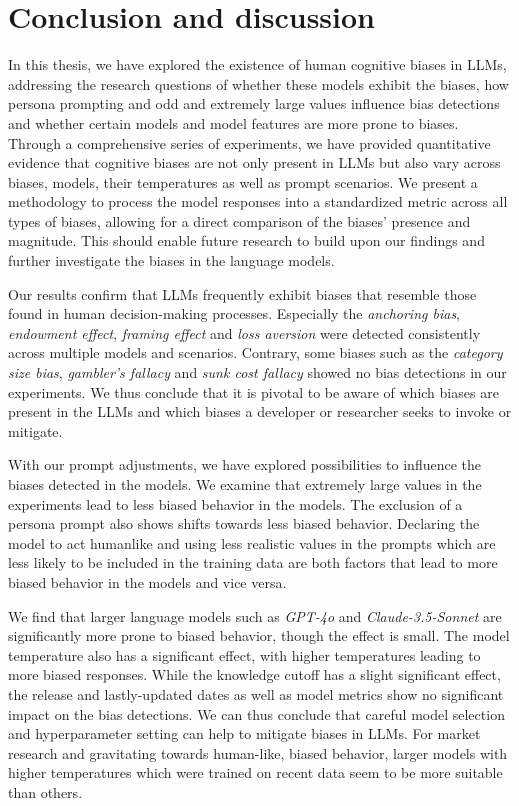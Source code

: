 \section{Conclusion and discussion}
\label{chapter:discussionoutlook}

\par In this thesis, we have explored the existence of human cognitive biases in LLMs, addressing the research questions of whether these models exhibit the biases, how persona prompting and odd and extremely large values influence bias detections and whether certain models and model features are more prone to biases. Through a comprehensive series of experiments, we have provided quantitative evidence that cognitive biases are not only present in LLMs but also vary across biases, models, their temperatures as well as prompt scenarios. We present a methodology to process the model responses into a standardized metric across all types of biases, allowing for a direct comparison of the biases' presence and magnitude. This should enable future research to build upon our findings and further investigate the biases in the language models.

\par Our results confirm that LLMs frequently exhibit biases that resemble those found in human decision-making processes. Especially the \textit{anchoring bias}, \textit{endowment effect}, \textit{framing effect} and \textit{loss aversion} were detected consistently across multiple models and scenarios. Contrary, some biases such as the \textit{category size bias}, \textit{gambler's fallacy} and \textit{sunk cost fallacy} showed no bias detections in our experiments. We thus conclude that it is pivotal to be aware of which biases are present in the LLMs and which biases a developer or researcher seeks to invoke or mitigate.

\par With our prompt adjustments, we have explored possibilities to influence the biases detected in the models. We examine that extremely large values in the experiments lead to less biased behavior in the models. The exclusion of a persona prompt also shows shifts towards less biased behavior. Declaring the model to act humanlike and using less realistic values in the prompts which are less likely to be included in the training data are both factors that lead to more biased behavior in the models and vice versa.

\par We find that larger language models such as \textit{GPT-4o} and \textit{Claude-3.5-Sonnet} are significantly more prone to biased behavior, though the effect is small. The model temperature also has a significant effect, with higher temperatures leading to more biased responses. While the knowledge cutoff has a slight significant effect, the release and lastly-updated dates as well as model metrics show no significant impact on the bias detections. We can thus conclude that careful model selection and hyperparameter setting can help to mitigate biases in LLMs. For market research and gravitating towards human-like, biased behavior, larger models with higher temperatures which were trained on recent data seem to be more suitable than others.

